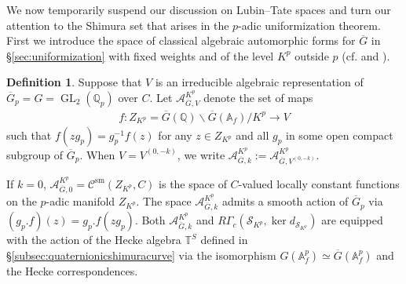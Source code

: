 \documentclass{article}
\theoremstyle{definition}
\newtheorem{definition}[theorem]{Definition}
\def\calA{\mathcal{A}}
\def\calC{\mathcal{C}}
\def\calS{\mathcal{S}}
\def\bbA{\mathbb{A}}
\def\bbQ{\mathbb{Q}}
\def\bbT{\mathbb{T}}
\def\bs{\backslash}
\DeclareMathOperator{\GL}{GL}
\def\sm{\mathrm{sm}}
\def\bar{\overline}
\begin{document}
We now temporarily suspend our discussion on Lubin--Tate spaces and turn our attention to the Shimura set that arises in the $p$-adic uniformization theorem. First we introduce the space of classical algebraic automorphic forms for $\bar G$ in \S\ref{sec:uniformization} with fixed weights and of the level $K^p$ outside $p$ (cf. \cite{gross1999algebraic} and \cite[\S 3]{loeffler2011overconvergent}). 
\begin{definition}\label{def:algebraicautomorphicform}
Suppose that $V$ is an irreducible algebraic representation of $\bar G_p=G=\GL_2(\bbQ_p)$ over $C$. Let $\calA^{K^p}_{\bar G,V}$ denote the set of maps
\begin{align}\label{eq:defofAKvGk}
    f:Z_{K^p}=\bar G(\bbQ)\bs\bar G(\bbA_f)/K^p  \to V
\end{align}
such that $f(zg_p)=g_p^{-1}f(z)$ for any $z\in Z_{K^p}$ and all $g_p$ in some open compact subgroup of $\bar G_p$. When $V=V^{(0,-k)}$, we write $\calA^{K^p}_{\bar G,k}:=\calA^{K^p}_{\bar G,V^{(0,-k)}}$.    
\end{definition}
If $k=0$, $\calA^{K^p}_{\bar G,0}=\calC^{\sm}(Z_{K^p},C)$ is the space of $C$-valued  locally constant functions on the $p$-adic manifold $Z_{K^p}$. The space $\calA^{K^p}_{\bar G,k}$ admits a smooth action of $\bar G_p$ via $(g_p.f)(z)=g_p.f(zg_p)$. Both $\calA^{K^p}_{\bar G,k}$ and $R\Gamma_c(\calS_{K^p},\ker d_{\calS_{K^p}})$ are equipped with the action of the Hecke algebra $\bbT^S$ defined in \S\ref{subsec:quaternionicshimuracurve} via the isomorphism $G(\bbA_f^p)\simeq \bar G(\bbA_f^p)$ and the Hecke correspondences.
\end{document}
